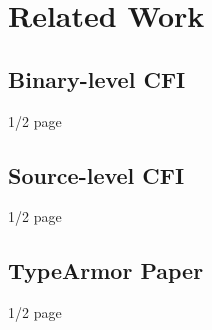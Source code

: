 \chapter{Related Work}
\label{chapter:Related_Work}

\section{Binary-level CFI}
1/2 page

\section{Source-level CFI}
1/2 page

\section{TypeArmor Paper}
1/2 page